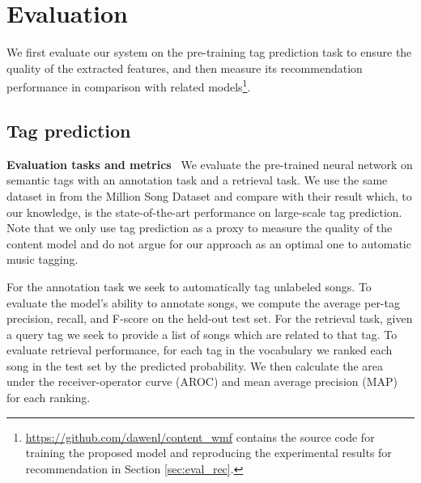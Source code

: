 \section{Evaluation}\label{eval}

We first evaluate our system on the pre-training tag prediction task to ensure the quality of the extracted features, and then measure its recommendation performance in comparison with related models\footnote{\url{https://github.com/dawenl/content_wmf} contains the source code for training the proposed model and reproducing the experimental results for recommendation in Section \ref{sec:eval_rec}.}.

\subsection{Tag prediction}\label{sec:tag}

\noindent\textbf{Evaluation tasks and  metrics}~
We evaluate the pre-trained neural network on semantic tags with an annotation task and a retrieval task. We use the same dataset in \citet{liang2014codebook} from the Million Song Dataset \cite{Bertin-Mahieux2011} and compare with their result which, to our knowledge, is the state-of-the-art performance on large-scale tag prediction. Note that we only use tag prediction as a proxy to measure the quality of the content model and do not argue for our approach as an optimal one to automatic music tagging.  

For the annotation task we seek to automatically tag unlabeled songs. To evaluate the model's ability to annotate songs, we compute the average per-tag precision, recall, and F-score on the held-out test set. %
For the retrieval task, given a query tag we seek to provide a list of songs which are related to that tag. To evaluate retrieval performance, for each tag in the vocabulary we ranked each song in the test set by the predicted probability. We then calculate the area under the receiver-operator curve (AROC) and mean average precision (MAP) for each ranking. %

